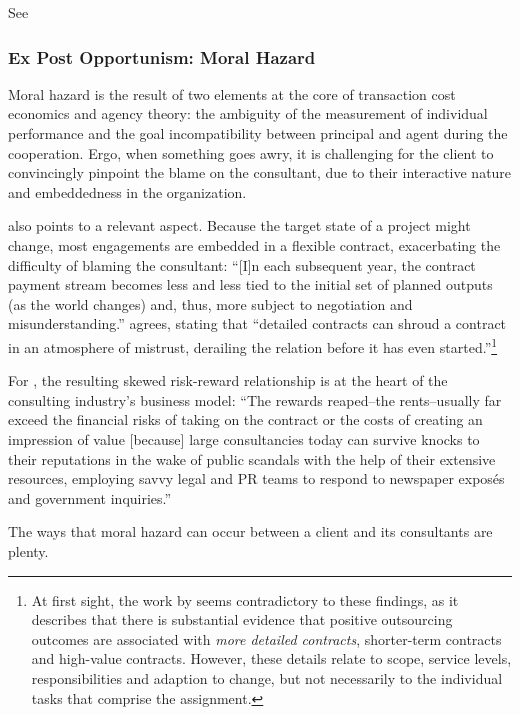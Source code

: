 \documentclass[12pt]{article}
\begin{document}
See \citet[4]{sturdy2021}

\subsubsection{Ex Post Opportunism: Moral
Hazard}\label{ex-post-opportunism-moral-hazard}

Moral hazard is the result of two elements at the core of transaction
cost economics and agency theory: the ambiguity of the measurement of
individual performance and the goal incompatibility between principal
and agent during the cooperation. Ergo, when something goes awry, it is
challenging for the client to convincingly pinpoint the blame on the
consultant, due to their interactive nature and embeddedness in the
organization.

\citet[9]{mcfarlan1995} also points to a relevant aspect. Because the
target state of a project might change, most engagements are embedded in
a flexible contract, exacerbating the difficulty of blaming the
consultant: ``{[}I{]}n each subsequent year, the contract payment stream
becomes less and less tied to the initial set of planned outputs (as the
world changes) and, thus, more subject to negotiation and
misunderstanding.'' \citet[924]{nooteboom1996} agrees, stating that
``detailed contracts can shroud a contract in an atmosphere of mistrust,
derailing the relation before it has even started.''\footnote{At first
  sight, the work by \citet[4]{lacity2012} seems contradictory to these
  findings, as it describes that there is substantial evidence that
  positive outsourcing outcomes are associated with \emph{more detailed
  contracts}, shorter-term contracts and high-value contracts. However,
  these details relate to scope, service levels, responsibilities and
  adaption to change, but not necessarily to the individual tasks that
  comprise the assignment.}

For \citet[145]{mazzucato2023}, the resulting skewed risk-reward
relationship is at the heart of the consulting industry's business
model: ``The rewards reaped--the rents--usually far exceed the financial
risks of taking on the contract or the costs of creating an impression
of value {[}because{]} large consultancies today can survive knocks to
their reputations in the wake of public scandals with the help of their
extensive resources, employing savvy legal and PR teams to respond to
newspaper exposés and government inquiries.''

The ways that moral hazard can occur between a client and its
consultants are plenty.
\end{document}
